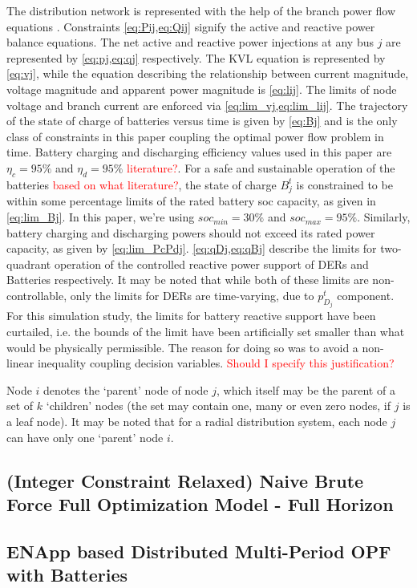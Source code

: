 \documentclass{article}
\begin{document}
The distribution network is represented with the help of the branch power flow equations . Constraints \cref{eq:Pij,eq:Qij} signify the active and reactive power balance equations. The net active and reactive power injections at any bus \(j\) are represented by \cref{eq:pj,eq:qj} respectively. The KVL equation is represented by \cref{eq:vj}, while the equation describing the relationship between current magnitude, voltage magnitude and apparent power magnitude is \cref{eq:lij}. The limits of node voltage and branch current are enforced via \cref{eq:lim_vj,eq:lim_lij}. The trajectory of the state of charge of batteries versus time is given by \cref{eq:Bj} and is the only class of constraints in this paper coupling the optimal power flow problem in time. Battery charging and discharging efficiency values used in this paper are $\eta_c = 95\%$ and $\eta_d = 95\%$ \textcolor{red}{literature?}. For a safe and sustainable operation of the batteries \textcolor{red}{based on what literature?}, the state of charge $B^{t}_{j}$ is constrained to be within some percentage limits of the rated battery soc capacity, as given in \cref{eq:lim_Bj}. In this paper, we're using $soc_{min} = 30\%$ and $soc_{max} = 95\%$. Similarly, battery charging and discharging powers should not exceed its rated power capacity, as given by \cref{eq:lim_PcPdj}.  \cref{eq:qDj,eq:qBj} describe the limits for two-quadrant operation of the controlled reactive power support of DERs and Batteries respectively. It may be noted that while both of these limits are non-controllable, only the limits for DERs are time-varying, due to $p^{t}_{D_j}$ component. For this simulation study, the limits for battery reactive support have been curtailed, i.e. the bounds of the limit have been artificially set smaller than what would be physically permissible. The reason for doing so was to avoid a non-linear inequality coupling decision variables. \textcolor{red}{Should I specify this justification?}

Node $i$ denotes the `parent' node of node $j$, which itself may be the parent of a set of $k$ `children' nodes (the set may contain one, many or even zero nodes, if $j$ is a leaf node). It may be noted that for a radial distribution system, each node $j$ can have only one `parent' node $i$.

\subsection*{(Integer Constraint Relaxed) Naive Brute Force Full Optimization Model - Full Horizon}



\subsection{ENApp based Distributed Multi-Period OPF with Batteries}
\end{document}
